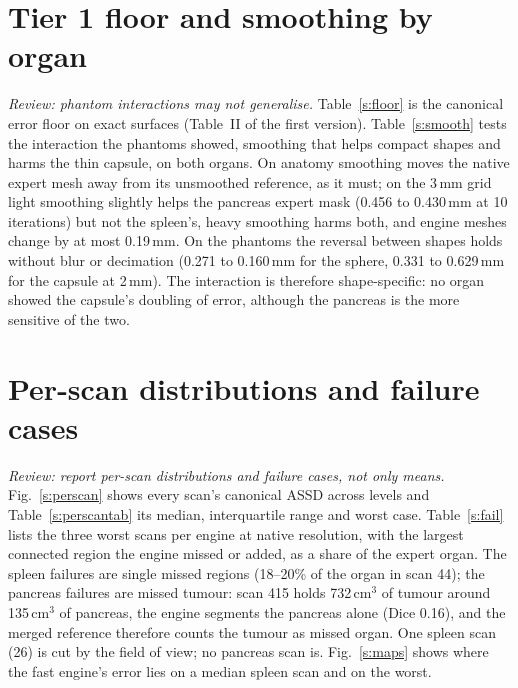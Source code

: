 \documentclass[conference]{IEEEtran}
\newcommand{\mm}{\,mm\xspace}
\begin{document}
\begin{table}[!t]
\caption{Design and counts of every run.}
\label{s:counts}
\centering\footnotesize

\end{table}

\section{Tier 1 floor and smoothing by organ}
\emph{Review: phantom interactions may not generalise.} Table~\ref{s:floor} is the canonical error floor on exact surfaces (Table~II of the first version). Table~\ref{s:smooth} tests the interaction the phantoms showed, smoothing that helps compact shapes and harms the thin capsule, on both organs. On anatomy smoothing moves the native expert mesh away from its unsmoothed reference, as it must; on the 3\mm grid light smoothing slightly helps the pancreas expert mask (0.456 to 0.430\mm at 10 iterations) but not the spleen's, heavy smoothing harms both, and engine meshes change by at most 0.19\mm. On the phantoms the reversal between shapes holds without blur or decimation (0.271 to 0.160\mm for the sphere, 0.331 to 0.629\mm for the capsule at 2\mm). The interaction is therefore shape-specific: no organ showed the capsule's doubling of error, although the pancreas is the more sensitive of the two.

\begin{table}[!t]
\caption{Tier~1 error floor: ASSD (HD95) in mm of the canonical reconstruction against the exact surface, mean of five placements.}
\label{s:floor}
\centering\scriptsize
\setlength{\tabcolsep}{2.5pt}

\end{table}

\begin{table}[!t]
\caption{Mean ASSD (mm) by Taubin iterations without blur or decimation (Lewiner marching cubes for the phantoms).}
\label{s:smooth}
\centering\scriptsize
\setlength{\tabcolsep}{2.5pt}

\end{table}

\section{Per-scan distributions and failure cases}
\emph{Review: report per-scan distributions and failure cases, not only means.} Fig.~\ref{s:perscan} shows every scan's canonical ASSD across levels and Table~\ref{s:perscantab} its median, interquartile range and worst case. Table~\ref{s:fail} lists the three worst scans per engine at native resolution, with the largest connected region the engine missed or added, as a share of the expert organ. The spleen failures are single missed regions (18--20\% of the organ in scan 44); the pancreas failures are missed tumour: scan 415 holds 732\,cm$^3$ of tumour around 135\,cm$^3$ of pancreas, the engine segments the pancreas alone (Dice 0.16), and the merged reference therefore counts the tumour as missed organ. One spleen scan (26) is cut by the field of view; no pancreas scan is. Fig.~\ref{s:maps} shows where the fast engine's error lies on a median spleen scan and on the worst.
\end{document}
